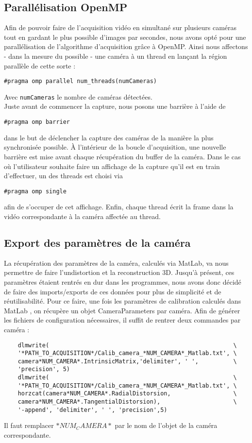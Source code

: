 \subsection{Parallélisation OpenMP}
Afin de pouvoir faire de l'acquisition vidéo en simultané sur plusieurs caméras tout en gardant le plus possible d'images par secondes, nous avons opté pour une parallélisation de l'algorithme d'acquisition grâce à OpenMP. Ainsi nous affectons - dans la mesure du possible - une caméra à un thread en lançant la région parallèle de cette sorte :
\begin{verbatim}
#pragma omp parallel num_threads(numCameras)
\end{verbatim}
Avec \texttt{numCameras} le nombre de caméras détectées. \\
Juste avant de commencer la capture, nous posons une barrière à l'aide de 
\begin{verbatim}
#pragma omp barrier
\end{verbatim}
dans le but de déclencher la capture des caméras de la manière la plus synchronisée possible.
À l'intérieur de la boucle d'acquisition, une nouvelle barrière est mise avant chaque récupération du buffer de la caméra.
Dans le cas où l'utilisateur souhaite faire un affichage de la capture qu'il est en train d'effectuer, un des threads est choisi via
\begin{verbatim}
#pragma omp single
\end{verbatim}
afin de s'occuper de cet affichage.
Enfin, chaque thread écrit la frame dans la vidéo correspondante à la caméra affectée au thread.

\subsection{Export des paramètres de la caméra}

La récupération des paramètres de la caméra, calculés via MatLab, va nous permettre de faire l'undistortion et la reconstruction 3D. Jusqu'à présent, ces paramètres étaient rentrés en dur dans les programmes, nous avons donc décidé de faire des imports/exports de ces données pour plus de simplicité et de réutilisabilité.
Pour ce faire, une fois les paramètres de calibration calculés dans MatLab , on récupère un objet CameraParameters par caméra. Afin de générer les fichiers de configuration nécessaires, il suffit de rentrer deux commandes par caméra :

\begin{verbatim}
	dlmwrite( 													  \
	'*PATH_TO_ACQUISITION*/Calib_camera_*NUM_CAMERA*_Matlab.txt', \
	camera*NUM_CAMERA*.IntrinsicMatrix,'delimiter', ' ',		  \
	'precision', 5)
	dlmwrite(													  \
	'*PATH_TO_ACQUISITION*/Calib_camera_*NUM_CAMERA*_Matlab.txt', \
	horzcat(camera*NUM_CAMERA*.RadialDistorsion,				  \
	camera*NUM_CAMERA*.TangentialDistorsion),					  \
	'-append', 'delimiter', ' ', 'precision',5)
\end{verbatim}

Il faut remplacer $*NUM_CAMERA*$ par le nom de l'objet de la caméra correspondante.